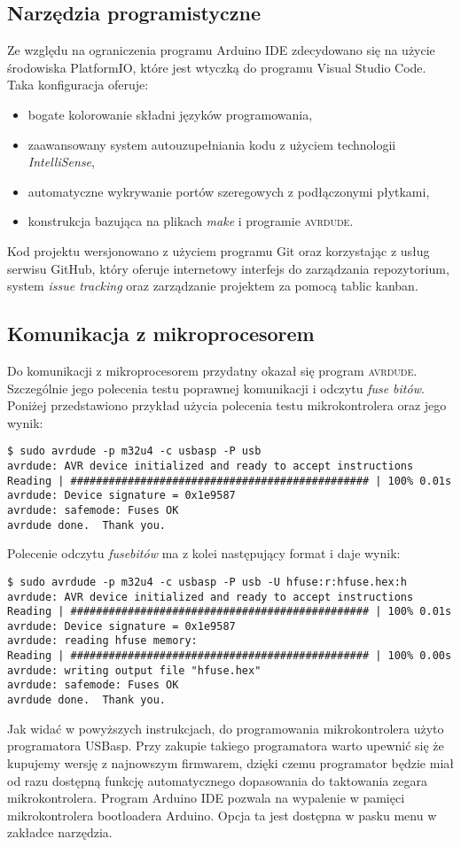 \documentclass[11pt]{article}
\begin{document}
\subsection{Narzędzia programistyczne}
Ze względu na ograniczenia programu Arduino IDE zdecydowano się na użycie środowiska PlatformIO, które jest wtyczką do programu Visual Studio Code. Taka konfiguracja oferuje:
\begin{itemize}
	\item bogate kolorowanie składni języków programowania,
	\item zaawansowany system autouzupełniania kodu z użyciem technologii \textit{IntelliSense},
	\item automatyczne wykrywanie portów szeregowych z podłączonymi płytkami,
	\item konstrukcja bazująca na plikach \textit{make} i programie \textsc{avrdude}.
\end{itemize}
Kod projektu wersjonowano z użyciem programu Git oraz korzystając z usług serwisu GitHub, który oferuje internetowy interfejs do zarządzania repozytorium, system \textit{issue tracking} oraz zarządzanie projektem za pomocą tablic kanban.

\subsection{Komunikacja z mikroprocesorem}
Do komunikacji z mikroprocesorem przydatny okazał się program \textsc{avrdude}. Szczególnie jego polecenia testu poprawnej komunikacji i odczytu \textit{fuse bitów}. Poniżej przedstawiono przykład użycia polecenia testu mikrokontrolera oraz jego wynik:

\begin{verbatim}
$ sudo avrdude -p m32u4 -c usbasp -P usb
avrdude: AVR device initialized and ready to accept instructions
Reading | ############################################### | 100% 0.01s
avrdude: Device signature = 0x1e9587
avrdude: safemode: Fuses OK
avrdude done.  Thank you.
\end{verbatim}
Polecenie odczytu \textit{fusebitów} ma z kolei następujący format i daje wynik:
\begin{verbatim}
$ sudo avrdude -p m32u4 -c usbasp -P usb -U hfuse:r:hfuse.hex:h
avrdude: AVR device initialized and ready to accept instructions
Reading | ############################################### | 100% 0.01s
avrdude: Device signature = 0x1e9587
avrdude: reading hfuse memory:
Reading | ############################################### | 100% 0.00s
avrdude: writing output file "hfuse.hex"
avrdude: safemode: Fuses OK
avrdude done.  Thank you.
\end{verbatim}
Jak widać w powyższych instrukcjach, do programowania mikrokontrolera użyto programatora USBasp.
Przy zakupie takiego programatora warto upewnić się że kupujemy wersję z najnowszym firmwarem, dzięki czemu programator będzie miał od razu dostępną funkcję automatycznego dopasowania do taktowania zegara mikrokontrolera.
Program Arduino IDE pozwala na wypalenie w pamięci mikrokontrolera bootloadera Arduino. Opcja ta jest dostępna w pasku menu w zakładce narzędzia.
\end{document}
